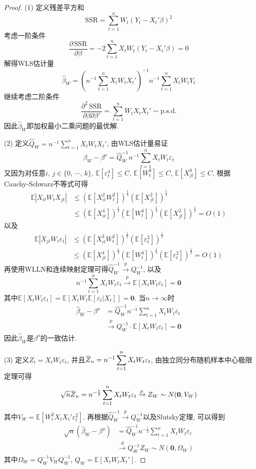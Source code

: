 \documentclass[cn,12pt,math=mtpro2,citestyle=gb7714-2015,bibstyle=gb7714-2015,twocol,mode=simple]{elegantbook}
\newcommand{\overbar}[1]{\mkern 1.5mu\overline{\mkern-1.5mu#1\mkern-1.5mu}\mkern 1.5mu}
\newcommand{\E}{\mathbb{E}}
\newcommand{\hbeta}{\hat{\beta}}
\begin{document}
  \begin{proof}
    (1) 定义残差平方和
    $$\text{SSR}=\sum_{t=1}^{n}W_t(Y_t-X_t'\beta)^2$$
    考虑一阶条件
    $$\frac{\partial\, \text{SSR}}{\partial \beta}=-2\sum_{t=1}^{n}X_tW_t(Y_t-X_t'\beta)=0$$
    解得WLS估计量
    $$\hbeta_W=\left(n^{-1}\sum_{t=1}^{n} X_tW_tX_t'\right)^{-1}n^{-1}\sum_{t=1}^{n}X_tW_tY_t$$
    继续考虑二阶条件
    $$\frac{\partial^2\,\text{SSR}}{\partial\beta\partial\beta'}=\sum_{t=1}^{n}W_tX_tX_t'\sim \text{p.s.d.}$$
    因此$\hbeta_W$即加权最小二乘问题的最优解.

    (2) 定义$\displaystyle \hat{Q}_W=n^{-1}\sum_{t=1}^{n}X_tW_tX_t'$, 由WLS估计量易证
    $$\hbeta_W-\beta^o=\hat{Q}^{-1}_W n^{-1}\sum_{t=1}^{n}X_tW_t\varepsilon_t$$
    又因为对任意$i$, $j \in \{0$, $\cdots$, $k\}$, $\E[\varepsilon_t^4]\leq C$, $\E[W_t^8]\leq C$, $\E[X_{jt}^8]\leq C$, 根据Cauchy-Schwarz不等式可得
    \begin{align*}
    \E|X_{it}W_tX_{jt}|&\leq(\E[X_{it}^2W_t^2])^{\frac{1}{2}}(\E[X_{jt}^2])^{\frac{1}{2}} \\
    &\leq(\E[X_{it}^4])^{\frac{1}{4}}(\E[W_t^4])^{\frac{1}{4}}(\E[X_{jt}^2])^{\frac{1}{2}}=O(1)
    \end{align*}
    以及
    \begin{align*}
    \E|X_{jt}W_t\varepsilon_t|&\leq(\E[X_{it}^2W_t^2])^{\frac{1}{2}}(\E[\varepsilon_t^2])^{\frac{1}{2}} \\
    &\leq(\E[X_{jt}^4])^{\frac{1}{4}}(\E[W_t^4])^{\frac{1}{4}}(\E[\varepsilon_t^2])^{\frac{1}{2}}=O(1)
    \end{align*}
    再使用WLLN和连续映射定理可得$\hat{Q}^{-1}_W\xrightarrow{p}Q^{-1}_W$, 以及
    $$n^{-1}\sum_{t=1}^{n}X_tW_t\varepsilon_t \xrightarrow{p} \E[X_tW_t\varepsilon_t]=\mathbf{0}$$
    其中$\E[X_tW_t\varepsilon_t]=\E[X_tW_t\E[\varepsilon_t|X_t]]=\mathbf{0}$. 当$n\rightarrow\infty$时
    \begin{align*}
    \hbeta_W-\beta^o&=\hat{Q}^{-1}_W n^{-1}\sum_{t=1}^{n}X_tW_t\varepsilon_t \\
    &\xrightarrow{p}Q_W^{-1}\cdot\E[X_tW_t\varepsilon_t]=\mathbf{0}
    \end{align*}
    因此$\hbeta_W$是$\beta^o$的一致估计.

    (3) 定义$Z_t=X_tW_t\varepsilon_t$, 并且$\displaystyle \overbar{Z}_n=n^{-1}\sum_{t=1}^{n}X_tW_t\varepsilon_t$, 由独立同分布随机样本中心极限定理可得
    $$\sqrt{n}\overbar{Z}_n=n^{-\frac{1}{2}}\sum_{t=1}^{n}X_tW_t\varepsilon_t\xrightarrow{p}Z_W\sim N(\mathbf{0}, V_W)$$
    其中$V_W=\E[W_t^2X_tX_t'\varepsilon_t^2]$. 再根据$\hat{Q}_W^{-1}\xrightarrow{p}Q^{-1}_W$以及Slutsky定理, 可以得到
    \begin{align*}
    \sqrt{n}(\hbeta_W-\beta^o)&=\hat{Q}_W^{-1}n^{-\frac{1}{2}}\sum_{t=1}^{n}X_tW_t\varepsilon_t \\
    &\xrightarrow{d}Q_W^{-1}Z_W \sim N(\mathbf{0}, \Omega_W)
    \end{align*}
    其中$\Omega_W=Q_W^{-1}V_WQ_W^{-1}$, $Q_W=\E[X_tW_tX_t']$.


\end{proof}
\end{document}
